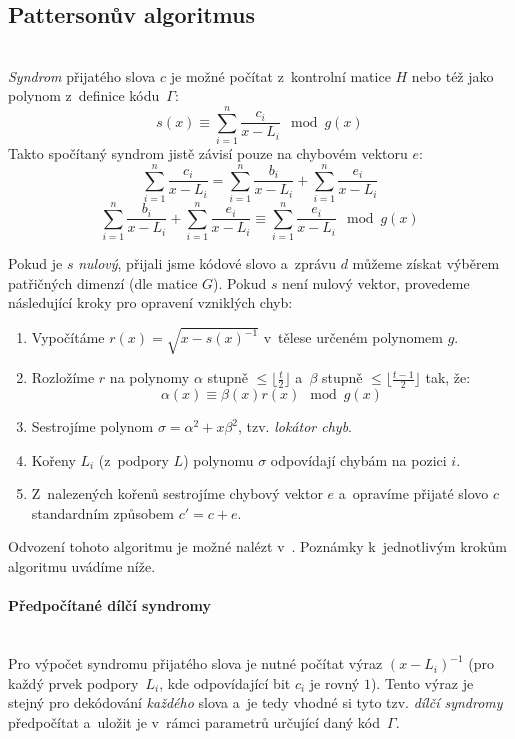 \documentclass[thesis=M,czech,hidelinks]{FITthesis}[2012/06/26]
\newcommand{\0}{{\textcolor[gray]{0.75}{0}}}
\begin{document}
\subsection{Pattersonův algoritmus} \hfil \\
\emph{Syndrom} přijatého slova $c$ je možné počítat z~kontrolní matice $H$ nebo
též jako polynom z~definice kódu~$\Gamma$:
$$ s(x) \equiv \sum_{i=1}^{n}\frac{c_i}{x-L_i} \mod g(x) $$
Takto spočítaný syndrom jistě závisí pouze na chybovém vektoru $e$:
$$
    \sum_{i=1}^{n}\frac{c_i}{x-L_i} =
    \sum_{i=1}^{n}\frac{b_i}{x-L_i} + \sum_{i=1}^{n}\frac{e_i}{x-L_i}
$$
$$
    \sum_{i=1}^{n}\frac{b_i}{x-L_i} + \sum_{i=1}^{n}\frac{e_i}{x-L_i} \equiv
    \sum_{i=1}^{n}\frac{e_i}{x-L_i} \mod g(x)
$$

Pokud je $s$ \emph{nulový}, přijali jsme kódové slovo a~zprávu $d$ můžeme získat
výběrem patřičných dimenzí (dle matice $G$). Pokud $s$ není nulový vektor,
provedeme následující kroky pro opravení vzniklých chyb:


\begin{enumerate}
    \item Vypočítáme $r(x) = \sqrt{x-s(x)^{-1}}$ v~tělese určeném polynomem $g$.

    \item Rozložíme $r$ na polynomy $\alpha$ stupně $\leq \lfloor\frac{t}{2}\rfloor$
        a~$\beta$ stupně $\leq \lfloor\frac{t-1}{2}\rfloor$ tak, že:
        $$ \alpha(x) \equiv \beta(x) r(x) \mod g(x) $$

    \item Sestrojíme polynom $\sigma = \alpha^2 + x \beta^2$,
        tzv. \emph{lokátor chyb}.

    \item Kořeny $L_i$ (z~podpory $L$) polynomu $\sigma$ odpovídají chybám
        na pozici $i$.

    \item Z~nalezených kořenů sestrojíme chybový vektor $e$ a~opravíme přijaté
        slovo $c$ standardním způsobem $c' = c + e$.
\end{enumerate}

Odvození tohoto algoritmu je možné nalézt v~\cite{Patterson}. Poznámky
k~jednotlivým krokům algoritmu uvádíme níže.


\paragraph{Předpočítané dílčí syndromy} \hfil \\
Pro výpočet syndromu přijatého slova je nutné počítat výraz $(x-L_i)^{-1}$ (pro
každý prvek podpory~$L_i$, kde odpovídající bit $c_i$ je rovný $1$). Tento výraz
je stejný pro dekódování \emph{každého} slova a~je tedy vhodné si tyto tzv.
\emph{dílčí syndromy} předpočítat a~uložit je v~rámci parametrů určující daný
kód~$\Gamma$.
\end{document}
